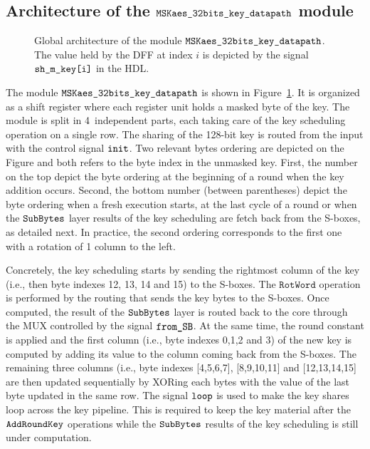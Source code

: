 \documentclass{scrartcl}
\begin{document}
\subsection{Architecture of the $\texttt{MSKaes\_32bits\_key\_datapath}$ module}

\begin{figure}
    \centering
    \resizebox{\textwidth}{!}{
        \begin{tikzpicture}
            
        \end{tikzpicture}
    }
    \caption{Global architecture of the module $\texttt{MSKaes\_32bits\_key\_datapath}$. The value held by the DFF at index $i$ is depicted by the signal $\texttt{sh\_m\_key[i]}$ in the HDL.}
    \label{fig:aes_dpKey}
\end{figure}

The module $\texttt{MSKaes\_32bits\_key\_datapath}$ is shown in Figure~\ref{fig:aes_dpKey}. It is
organized as a shift register where each register unit holds a masked byte of
the key. The module is split in 4~independent parts, each taking care of the
key scheduling operation on a single row. The sharing of the 128-bit key is
routed from the input with the control signal $\texttt{init}$. Two relevant
bytes ordering are depicted on the Figure and both refers to the byte index in
the unmasked key. First, the number on the top depict the byte ordering at the
beginning of a round when the key addition occurs. Second, the bottom number
(between parentheses) depict the byte ordering when a fresh execution starts,
at the last cycle of a round or when the $\texttt{SubBytes}$ layer results of the key
scheduling are fetch back from the S-boxes, as detailed next. In practice, the
second ordering corresponds to the first one with a rotation of 1 column to the
left.

Concretely, the key scheduling starts by sending the rightmost column of the key
(i.e., then byte indexes 12, 13, 14 and 15) to the S-boxes. The $\texttt{RotWord}$
operation is performed by the routing that sends the key bytes to the S-boxes.
Once computed, the result of the $\texttt{SubBytes}$ layer is routed back to the core through
the MUX controlled by the signal $\texttt{from\_SB}$. At the same time,
the round constant is applied and the first column (i.e., byte indexes 0,1,2
and 3) of the new key is computed by adding its value to the column coming back
from the S-boxes.  The remaining three columns (i.e., byte indexes [4,5,6,7],
[8,9,10,11] and [12,13,14,15] are then updated sequentially by XORing each
bytes with the value of the last byte updated in the same row. The signal
$\texttt{loop}$ is used to make the key shares loop across the key pipeline.
This is required to keep the key material after the $\texttt{AddRoundKey}$ operations while the
$\texttt{SubBytes}$ results of the key scheduling is still under computation. 
\end{document}
